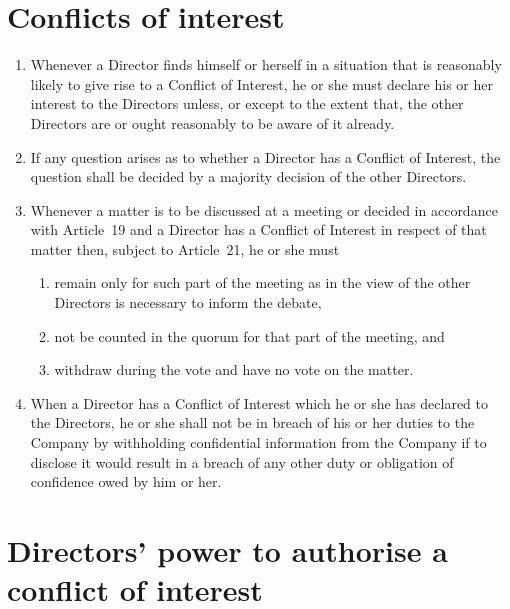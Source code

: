 \documentclass[a4paper,12pt]{article}
\begin{document}
\section{Conflicts of interest}

\begin{enumerate}
  \item Whenever a Director finds himself or herself in a situation that is reasonably likely to give rise to a Conflict of Interest, he or she must declare his or her interest to the Directors unless, or except to the extent that, the other Directors are or ought reasonably to be aware of it already.
  \item If any question arises as to whether a Director has a Conflict of Interest, the question shall be decided by a majority decision of the other Directors.
  \item Whenever a matter is to be discussed at a meeting or decided in accordance with Article 19 and a Director has a Conflict of Interest in respect of that matter then, subject to Article 21, he or she must
  \begin{enumerate}
    \item	remain only for such part of the meeting as in the view of the other Directors is necessary to inform the debate,
    \item not be counted in the quorum for that part of the meeting, and
    \item withdraw during the vote and have no vote on the matter.
  \end{enumerate}
  \item	When a Director has a Conflict of Interest which he or she has declared to the Directors, he or she shall not be in breach of his or her duties to the Company by withholding confidential information from the Company if to disclose it would result in a breach of any other duty or obligation of confidence owed by him or her.
\end{enumerate}

\section{Directors' power to authorise a conflict of interest}
\end{document}
